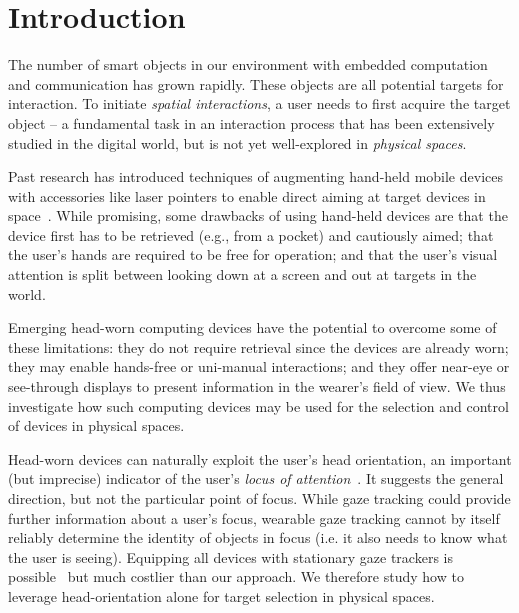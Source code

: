 \section{Introduction}

The number of smart objects in our environment with embedded computation and communication has grown rapidly. These objects are all potential targets for interaction. To initiate {\em spatial interactions}, a user needs to first acquire the target object -- a fundamental task in an interaction process that has been extensively studied in the digital world, but is not yet well-explored in {\em physical spaces}.

Past research has introduced techniques of augmenting hand-held mobile devices with accessories like laser pointers to enable direct aiming at target devices in space~\cite{beigl_point_1999,patel_2-way_2003}. While promising, some drawbacks of using hand-held devices are that the device first has to be retrieved (e.g., from a pocket) and cautiously aimed; that the user's hands are required to be free for operation; and that the user's visual attention is split between looking down at a screen and out at targets in the world. 

Emerging head-worn computing devices have the potential to overcome some of these limitations: they do not require retrieval since the devices are already worn; they may enable hands-free or uni-manual interactions; and they offer near-eye or see-through displays to present information in the wearer's field of view. We thus investigate how such computing devices may be used for the selection and control of devices in physical spaces.

Head-worn devices can naturally exploit the user's head orientation, an important (but imprecise) indicator of the user's {\em locus of attention}~\cite{raskin}. It suggests the general direction, but not the particular point of focus. While gaze tracking could provide further information about a user's focus, wearable gaze tracking cannot by itself reliably determine the identity of objects in focus (i.e. it also needs to know what the user is seeing). Equipping all devices with stationary gaze trackers is possible~\cite{vertegaal2005media} but much costlier than our approach. We therefore study how to leverage head-orientation alone for target selection in physical spaces. 

